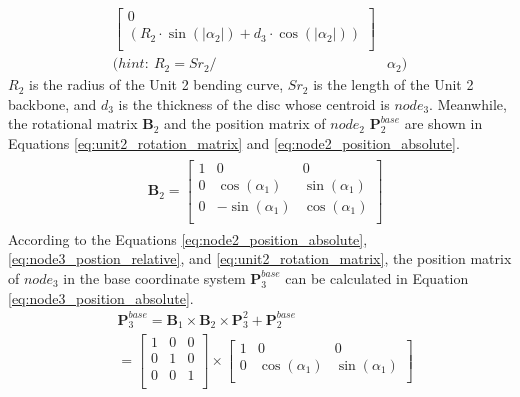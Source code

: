 \begin{itemize}
\begin{align}
\begin{bmatrix}
            0 \\
            (R_2\cdot \sin(\left|\alpha_2\right|) + d_3\cdot \cos(\left|\alpha_2\right|)) \\
        \end{bmatrix}&
        \label{eq:node3_postion_relative} \\
        \nonumber (hint: \ R_2 = {Sr}_2/ &\alpha_2)
    \end{align}
    $R_2$ is the radius of the Unit 2 bending curve, ${Sr}_2$ is the length of the Unit 2 backbone, and $d_3$ is the thickness 
    of the disc whose centroid is $node_3$. Meanwhile, the rotational matrix $\textbf{B}_{2}$ and the position matrix of 
    $node_2$ $\textbf{P}_{2}^{base}$ are shown in Equations \ref*{eq:unit2_rotation_matrix} and \ref{eq:node2_position_absolute}.
    \begin{align}
        &\begin{aligned}
            \textbf{B}_{2} = 
            \begin{bmatrix}
                1 & 0 & 0 \\
                0 & \cos(\alpha_1) & \sin(\alpha_1) \\
                0 & -\sin(\alpha_1) & \cos(\alpha_1) \\
            \end{bmatrix}
        \end{aligned}
        \label{eq:unit2_rotation_matrix}
    \end{align}
    According to the Equations \ref{eq:node2_position_absolute}, \ref{eq:node3_postion_relative}, and \ref*{eq:unit2_rotation_matrix}, 
    the position matrix of $node_{3}$ in the base coordinate system $\textbf{P}_{3}^{base}$ can be calculated in Equation \ref{eq:node3_position_absolute}.
    \begin{align}
        &\textbf{P}_{3}^{base} = \textbf{B}_{1} \times \textbf{B}_{2} \times \textbf{P}_{3}^{2} + \textbf{P}_{2}^{base} \nonumber \\
        &= 
        \begin{bmatrix}
            1 & 0 & 0 \\
            0 & 1 & 0 \\
            0 & 0 & 1 \\
        \end{bmatrix}
        \times
        \begin{bmatrix}
            1 & 0 & 0 \\
            0 & \cos(\alpha_1) & \sin(\alpha_1) \\

\end{bmatrix}
\end{align}
\end{itemize}
